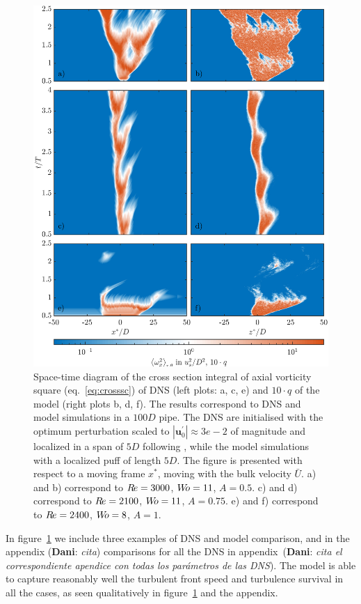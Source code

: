 \documentclass{article}
\DeclareRobustCommand{\dm}[1]{{\color{blue}(\textbf{Dani}: \textit{#1}\xspace)}}
\DeclareRobustCommand{\Reynolds}{\ensuremath{R\hspace{-0.1em}e}\xspace}     %
\DeclareRobustCommand{\Womersley}{\ensuremath{W\hspace{-0.25em}o}\xspace}    %
\DeclareRobustCommand{\Amplitude}{\ensuremath{A}\xspace}    %
\begin{document}
\begin{figure}
\centering
\includegraphics[width=\textwidth, trim=0mm 0mm 0mm 0mm, clip=true]{Figures9/Fig1.jpg}
\caption{Space-time diagram of the cross section integral of axial vorticity square (eq.~\eqref{eq:crosssc}) of DNS (left plots: a, c, e) and $10 \cdot q$ of the model (right plots b, d, f). The results correspond to DNS and model simulations in a $100D$ pipe. The DNS are initialised with the optimum perturbation scaled to $\left|\mathbf{u}^{\prime}_{0}\right|\approx 3e-2$ of magnitude and localized in a span of $5D$ following \cite{entropy2021}, while the model simulations with a localized puff of length $5D$. The figure is presented with respect to a moving frame $x^{*}$, moving with the bulk velocity $\bar{U}$. a) and b) correspond to $\Reynolds=3000$, $\Womersley=11$, $\Amplitude=0.5$. c) and d) correspond to $\Reynolds=2100$, $\Womersley=11$, $\Amplitude=0.75$. e) and f) correspond to $\Reynolds=2400$, $\Womersley=8$, $\Amplitude=1$. }
\label{fig:fig1}
\end{figure}
In figure~\ref{fig:fig1} we include three examples of DNS and model comparison, and in the appendix \dm{cita} comparisons for all the DNS in appendix~\dm{cita el correspondiente apendice con todas los parámetros de las DNS}. The model is able to capture reasonably well the turbulent front speed and turbulence survival in all the cases, as seen qualitatively in figure~\ref{fig:fig1} and the appendix. 
\end{document}
